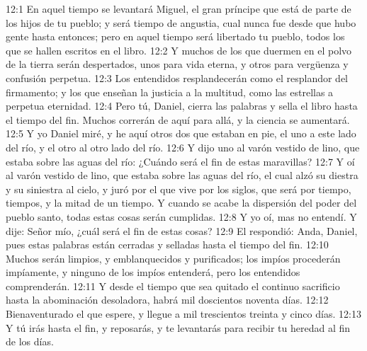 12:1 En aquel tiempo se levantará Miguel, el gran príncipe que está de parte de los hijos de tu pueblo; y será tiempo de angustia, cual nunca fue desde que hubo gente hasta entonces; pero en aquel tiempo será libertado tu pueblo, todos los que se hallen escritos en el libro. 
12:2 Y muchos de los que duermen en el polvo de la tierra serán despertados, unos para vida eterna, y otros para vergüenza y confusión perpetua. 
12:3 Los entendidos resplandecerán como el resplandor del firmamento; y los que enseñan la justicia a la multitud, como las estrellas a perpetua eternidad. 
12:4 Pero tú, Daniel, cierra las palabras y sella el libro hasta el tiempo del fin. Muchos correrán de aquí para allá, y la ciencia se aumentará. 
12:5 Y yo Daniel miré, y he aquí otros dos que estaban en pie, el uno a este lado del río, y el otro al otro lado del río. 
12:6 Y dijo uno al varón vestido de lino, que estaba sobre las aguas del río: ¿Cuándo será el fin de estas maravillas? 
12:7 Y oí al varón vestido de lino, que estaba sobre las aguas del río, el cual alzó su diestra y su siniestra al cielo, y juró por el que vive por los siglos, que será por tiempo, tiempos, y la mitad de un tiempo. Y cuando se acabe la dispersión del poder del pueblo santo, todas estas cosas serán cumplidas. 
12:8 Y yo oí, mas no entendí. Y dije: Señor mío, ¿cuál será el fin de estas cosas? 
12:9 El respondió: Anda, Daniel, pues estas palabras están cerradas y selladas hasta el tiempo del fin. 
12:10 Muchos serán limpios, y emblanquecidos y purificados; los impíos procederán impíamente, y ninguno de los impíos entenderá, pero los entendidos comprenderán. 
12:11 Y desde el tiempo que sea quitado el continuo sacrificio hasta la abominación desoladora, habrá mil doscientos noventa días. 
12:12 Bienaventurado el que espere, y llegue a mil trescientos treinta y cinco días. 
12:13 Y tú irás hasta el fin, y reposarás, y te levantarás para recibir tu heredad al fin de los días.

